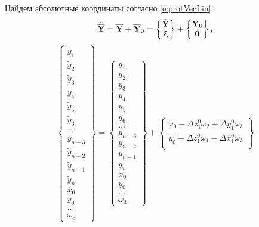 Найдем абсолютные координаты согласно \eqref{eq:rotVecLin}:
\begin{equation}
	\tilde{\overline{\mathbf{Y}}} = \overline{\mathbf{Y}} + \overline{\mathbf{Y}}_0 =
	\begin{Bmatrix} \tilde{\mathbf{Y}} \\ \upxi \end{Bmatrix}
	+
	\begin{Bmatrix} \mathbf{Y}_0 \\ \mathbf{0} \end{Bmatrix}, \label{AbsoluteCoord}
\end{equation}
\begin{equation*}
	\begin{Bmatrix}
		\tilde{y}_1 \\
		\tilde{y}_2 \\
		\tilde{y}_3 \\
		\tilde{y}_4 \\
		\tilde{y}_5 \\
		\tilde{y}_6 \\
		\hdots \\
		\tilde{y}_{n-3} \\
		\tilde{y}_{n-2} \\
		\tilde{y}_{n-1} \\
		\tilde{y}_{n} \\
		x_0 \\
		y_0 \\
		\hdots \\
		\omega_3
	\end{Bmatrix} =
	\begin{Bmatrix}
		y_1 \\
		y_2 \\
		y_3 \\
		y_4 \\
		y_5 \\
		y_6 \\
		\hdots \\
		y_{n-3} \\
		y_{n-2} \\
		y_{n-1} \\
		y_{n} \\
		x_0 \\
		y_0 \\
		\hdots \\
		\omega_3
	\end{Bmatrix} +
	\begin{Bmatrix}
		x_0 - \Delta z_1^0 \omega_2 + \Delta y_1^0 \omega_3 \\
		y_0 + \Delta z_1^0 \omega_1 - \Delta x_1^0 \omega_3 \\

\end{Bmatrix}
\end{equation*}

